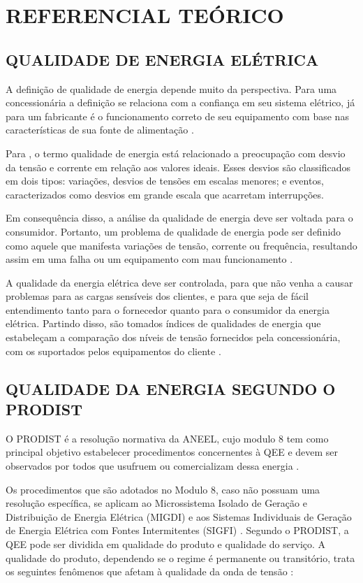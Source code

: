 \chapter{REFERENCIAL TEÓRICO}

\section{QUALIDADE DE ENERGIA ELÉTRICA}

A definição de qualidade de energia depende muito da perspectiva. Para uma concessionária a definição se relaciona com a confiança em seu sistema elétrico, já para um fabricante é o funcionamento correto de seu equipamento com base nas características de sua fonte de alimentação \cite{ref:dugan_2004}.

Para , o termo qualidade de energia está relacionado a preocupação com desvio da tensão e corrente em relação aos valores ideais. Esses desvios são classificados em dois tipos: variações, desvios de tensões em escalas menores; e eventos, caracterizados como desvios em grande escala que acarretam interrupções.

Em consequência disso, a análise da qualidade de energia deve ser voltada para o consumidor. Portanto, um problema de qualidade de energia pode ser definido como aquele que manifesta variações de tensão, corrente ou frequência, resultando assim em uma falha ou um equipamento com mau funcionamento \cite{ref:dugan_2004}.

A qualidade da energia elétrica deve ser controlada, para que não venha a causar problemas para as cargas sensíveis dos clientes, e para que seja de fácil entendimento tanto para o fornecedor quanto para o consumidor da energia elétrica. Partindo disso, são tomados índices de qualidades de energia que estabeleçam a comparação dos níveis de tensão fornecidos pela concessionária, com os suportados pelos equipamentos do cliente \cite{ref:dugan_2004}.

\section{QUALIDADE DA ENERGIA SEGUNDO O PRODIST}

O PRODIST é a resolução normativa da ANEEL, cujo modulo 8 tem como principal objetivo estabelecer procedimentos concernentes à QEE e devem ser observados por todos que usufruem ou comercializam dessa energia \cite{ref:ANEEL2021}.

Os procedimentos que são adotados no Modulo 8, caso não possuam uma resolução específica, se aplicam ao Microssistema Isolado de Geração e Distribuição de Energia Elétrica (MIGDI) e aos Sistemas Individuais de Geração de Energia Elétrica com Fontes Intermitentes (SIGFI) \cite{ref:ANEEL2021}. Segundo o PRODIST, a QEE pode ser dividida em qualidade do produto e qualidade do serviço. A qualidade do produto, dependendo se o regime é permanente ou transitório, trata os seguintes fenômenos que afetam à qualidade da onda de tensão \cite{ref:ANEEL2021}:

